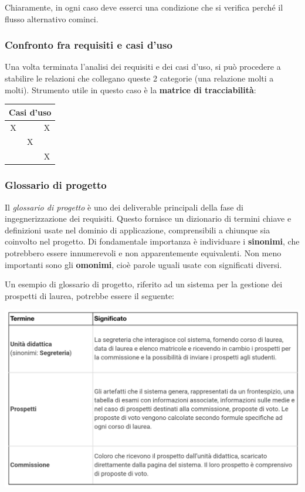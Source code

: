\documentclass[a4paper,11pt]{article}
\begin{document}
Chiaramente, in ogni caso deve esserci una condizione che si verifica perché il flusso alternativo cominci.

\subsubsection{Confronto fra requisiti e casi d'uso}
Una volta terminata l'analisi dei requisiti e dei casi d'uso, si può procedere a stabilire le relazioni che collegano queste 2 categorie (una relazione molti a molti).
Strumento utile in questo caso è la \textbf{matrice di tracciabilità}:

\begin{center}
\begin{tabular}[b]{| c | c | c |}
  \multicolumn{3}{c}{Casi d'uso} \\
	\hline
	X & & X \\
	\hline
		& X & \\
		\hline
		& & X \\
	 \hline
\end{tabular}
\end{center}

\subsubsection{Glossario di progetto}
Il \textit{glossario di progetto} è uno dei deliverable principali della fase di ingegnerizzazione dei requisiti.
Questo fornisce un dizionario di termini chiave e definizioni usate nel dominio di applicazione, comprensibili a chiunque sia coinvolto nel progetto.
Di fondamentale importanza è individuare i \textbf{sinonimi}, che potrebbero essere innumerevoli e non apparentemente equivalenti.
Non meno importanti sono gli \textbf{omonimi}, cioè parole uguali usate con significati diversi. 

\par\smallskip

Un esempio di glossario di progetto, riferito ad un sistema per la gestione dei prospetti di laurea, potrebbe essere il seguente:
\begin{center}
	\includegraphics[scale=0.28]{../figures/glossario.png}
\end{center}
\end{document}
